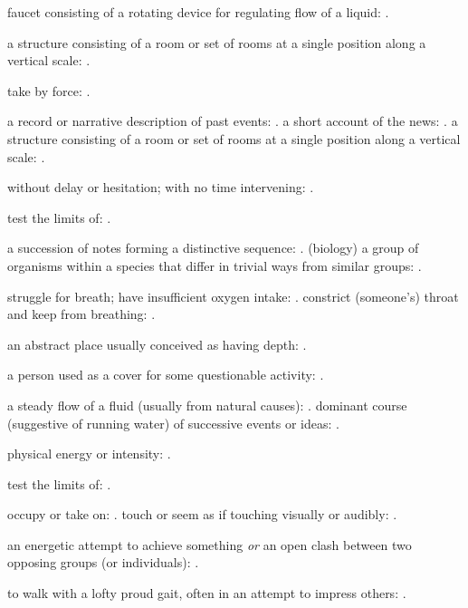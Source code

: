   faucet consisting of a rotating device for regulating flow of a liquid: .

  a structure consisting of a room or set of rooms at a single position along a vertical scale: .

  take by force: .

  a record or narrative description of past events: . a short account of the news: . a structure consisting of a room or set of rooms at a single position along a vertical scale: .

  without delay or hesitation; with no time intervening: .

  test the limits of: .

  a succession of notes forming a distinctive sequence: . (biology) a group of organisms within a species that differ in trivial ways from similar groups: .

  struggle for breath; have insufficient oxygen intake: . constrict (someone's) throat and keep from breathing: .

  an abstract place usually conceived as having depth: .

  a person used as a cover for some questionable activity: .

  a steady flow of a fluid (usually from natural causes): . dominant course (suggestive of running water) of successive events or ideas: .

  physical energy or intensity: .

  test the limits of: .

  occupy or take on: . touch or seem as if touching visually or audibly: .

  an energetic attempt to achieve something \textit{or} an open clash between two opposing groups (or individuals): .

  to walk with a lofty proud gait, often in an attempt to impress others: .

